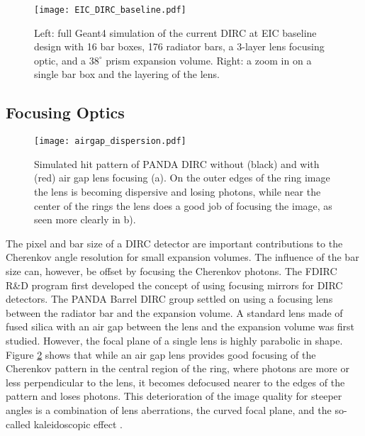 \begin{figure}[ht]
	\centering
	\texttt{[image: EIC\_DIRC\_baseline.pdf]}
	\caption{Left: full Geant4 simulation of the current DIRC at EIC baseline design with 16 bar boxes, 176 radiator bars, a 3-layer lens focusing optic, and a $38^\circ$ prism expansion volume. Right: a zoom in on a single bar box and the layering of the lens.}
	\label{fig:baseline_design}
\end{figure}

\subsection{Focusing Optics}

\begin{figure}[ht]
	\centering
	\texttt{[image: airgap\_dispersion.pdf]}
	\caption{Simulated hit pattern of PANDA DIRC without (black) and with (red) air gap lens focusing (a). On the outer edges of the ring image the lens is becoming dispersive  and losing photons, while near the center of the rings the lens does a good job of focusing the image, as seen more clearly in b).}
	\label{fig:airgap_dispersion}
\end{figure}

The pixel and bar size of a DIRC detector are important contributions to the Cherenkov angle resolution for small expansion volumes. The influence of the bar size can, however, be offset by focusing the Cherenkov photons. The FDIRC R\&D program first developed the concept of using focusing mirrors for DIRC detectors. The PANDA Barrel DIRC group settled on using a focusing lens between the radiator bar and the expansion volume. A standard lens made of fused silica with an air gap between the lens and the expansion volume was first studied. However, the focal plane of a single lens is highly parabolic in shape. Figure \ref{fig:airgap_dispersion} shows that while an air gap lens provides good focusing of the Cherenkov pattern in the central region of the ring, where photons are more or less perpendicular to the lens, it becomes defocused nearer to the edges of the pattern and loses photons. This deterioration of the image quality for steeper angles is a combination of lens aberrations, the curved focal plane, and the so-called kaleidoscopic effect \cite{FDIRCMathematica}.


